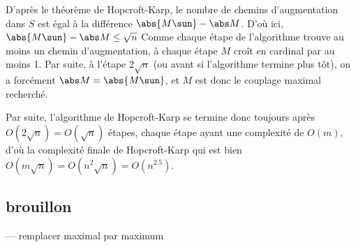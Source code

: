  D'après le théorème de Hopcroft-Karp, le nombre de chemins d'augmentation dans $S$ est égal à la différence $\abs {M\sun} - \abs M$. D'où ici, $\abs {M\sun} - \abs M \leq \sqrt n$ Comme chaque étape de l'algorithme trouve au moins un chemin d'augmentation, à chaque étape $M$ croît en cardinal par au moins 1. Par suite, à l'étape $2 \sqrt n$ (ou avant si l'algorithme termine plus tôt), on a forcément $\abs M = \abs {M\sun}$, et $M$ est donc le couplage maximal recherché.
 
 Par suite, l'algorithme de Hopcroft-Karp se termine donc toujours après $O(2\sqrt n) = O(\sqrt n)$ étapes, chaque étape ayant une complexité de $O(m)$, d'où la complexité finale de Hopcroft-Karp qui est bien $O(m \sqrt n) = O(n^2 \sqrt n) = O(n^{2.5})$.
 
 \subsection{brouillon}
 
 --- remplacer maximal par maximum
 

